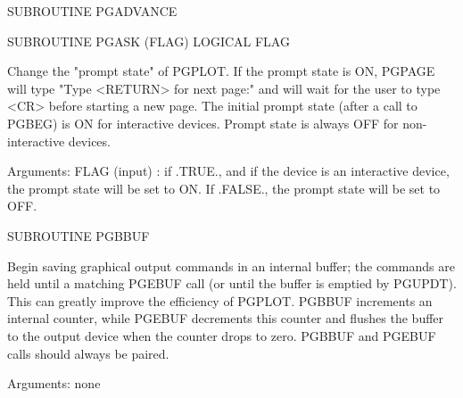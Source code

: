 
{\eightpoint\begintt
      SUBROUTINE PGADVANCE
\endtt}

{\eightpoint\begintt
      SUBROUTINE PGASK (FLAG)
      LOGICAL FLAG
 
Change the "prompt state" of PGPLOT. If the prompt state is
ON, PGPAGE will type "Type <RETURN> for next page:" and will wait
for the user to type <CR> before starting a new page.  The initial
prompt state (after a call to PGBEG) is ON for interactive devices.
Prompt state is always OFF for non-interactive devices.
 
Arguments:
 FLAG   (input)  : if .TRUE., and if the device is an interactive
                   device, the prompt state will be set to ON. If
                   .FALSE., the prompt state will be set to OFF.
\endtt}

{\eightpoint\begintt
      SUBROUTINE PGBBUF
 
Begin saving graphical output commands in an internal buffer; the
commands are held until a matching PGEBUF call (or until the buffer
is emptied by PGUPDT). This can greatly improve the efficiency of
PGPLOT.  PGBBUF increments an internal counter, while PGEBUF
decrements this counter and flushes the buffer to the output
device when the counter drops to zero.  PGBBUF and PGEBUF calls
should always be paired.
 
Arguments: none
\endtt}


